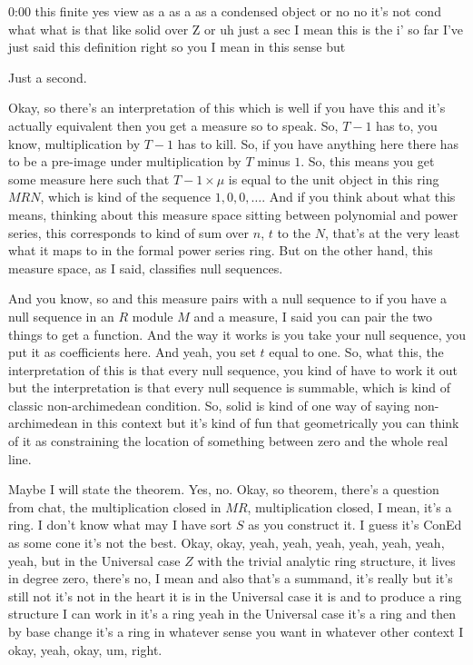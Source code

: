 \begin{unfinished}{0:00}
 this finite yes view as a as a as a condensed object or no no it's not cond what what is that like solid over Z or uh just a sec I mean this is the i' so far I've just said this definition right so you I mean in this sense but

Just a second.

Okay, so there's an interpretation of this which is well if you have this and it's actually equivalent then you get a measure so to speak. So, $T - 1$ has to, you know, multiplication by $T - 1$ has to kill. So, if you have anything here there has to be a pre-image under multiplication by $T$ minus $1$. So, this means you get some measure here such that $T - 1 \times \mu$ is equal to the unit object in this ring $MRN$, which is kind of the sequence $1, 0, 0, \ldots$. And if you think about what this means, thinking about this measure space sitting between polynomial and power series, this corresponds to kind of sum over $n$, $t$ to the $N$, that's at the very least what it maps to in the formal power series ring. But on the other hand, this measure space, as I said, classifies null sequences.

And you know, so and this measure pairs with a null sequence to if you have a null sequence in an $R$ module $M$ and a measure, I said you can pair the two things to get a function. And the way it works is you take your null sequence, you put it as coefficients here. And yeah, you set $t$ equal to one. So, what this, the interpretation of this is that every null sequence, you kind of have to work it out but the interpretation is that every null sequence is summable, which is kind of classic non-archimedean condition. So, solid is kind of one way of saying non-archimedean in this context but it's kind of fun that geometrically you can think of it as constraining the location of something between zero and the whole real line.

Maybe I will state the theorem. Yes, no. Okay, so theorem, there's a question from chat, the multiplication closed in $MR$, multiplication closed, I mean, it's a ring. I don't know what may I have sort $S$ as you construct it. I guess it's ConEd as some cone it's not the best. Okay, okay, yeah, yeah, yeah, yeah, yeah, yeah, yeah, but in the Universal case $Z$ with the trivial analytic ring structure, it lives in degree zero, there's no, I mean and also that's a summand, it's really but it's still not it's not in the heart it is in the Universal case it is and to produce a ring structure I can work in it's a ring yeah in the Universal case it's a ring and then by base change it's a ring in whatever sense you want in whatever other context I okay, yeah, okay, um, right. 


\end{unfinished}
